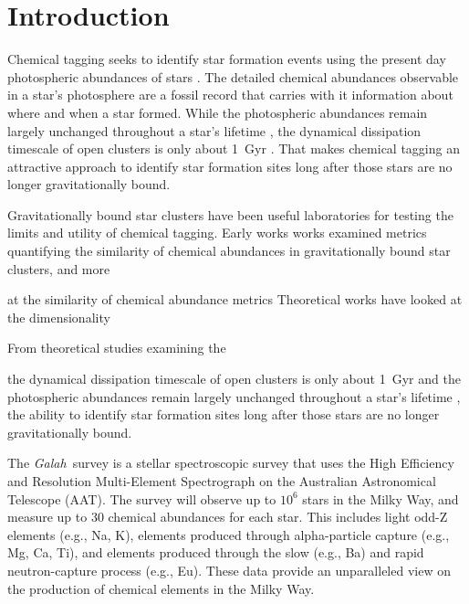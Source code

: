 \documentclass[twocolumn]{aastex61}
\newcommand{\project}[1]{\textsl{#1}}
\newcommand{\Galah}{\project{Galah}}
\begin{document}

\section{Introduction} \label{sec:intro}

Chemical tagging seeks to identify star formation events using the present
day photospheric abundances of stars \citep{Freeman;Bland-Hawthorn:2001}.
The detailed chemical abundances observable in a star's photosphere are a
fossil record that carries with it information about where and when a star
formed. While the photospheric abundances remain largely unchanged throughout
a star's lifetime \citep[however see][]{}, the dynamical dissipation timescale
of open clusters is only about 1~Gyr \citep{timescale}. That makes chemical
tagging an attractive approach to identify star formation sites long after
those stars are no longer gravitationally bound.

Gravitationally bound star clusters have been useful laboratories for
testing the limits and utility of chemical tagging. Early works 
works examined metrics quantifying the similarity of chemical abundances
in gravitationally bound star clusters, and more 

 at the similarity of chemical abundance metrics 
Theoretical works have looked at the dimensionality

From
theoretical studies examining the 

 the dynamical dissipation timescale of open clusters is only
about 1~Gyr \citep{timescale} and the photospheric abundances remain largely
unchanged throughout a star's lifetime \citep[however see][]{}, the ability
to identify star formation sites long after those stars are no longer
gravitationally bound.






The \Galah\ survey \citep{DaSilva:2015} is a stellar spectroscopic survey 
that uses the High Efficiency and Resolution Multi-Element 
Spectrograph \citep[HERMES][]{Sheinis:2016} on the Australian Astronomical Telescope (AAT).
The survey will observe up to $10^6$ stars in the Milky Way, and
measure up to 30 chemical abundances for each star. This includes
light odd-Z elements (e.g., Na, K), elements produced through
alpha-particle capture (e.g., Mg, Ca, Ti), and elements produced
through the slow (e.g., Ba) and rapid neutron-capture process
(e.g., Eu). These data provide an unparalleled view on the production
of chemical elements in the Milky Way.
\end{document}

